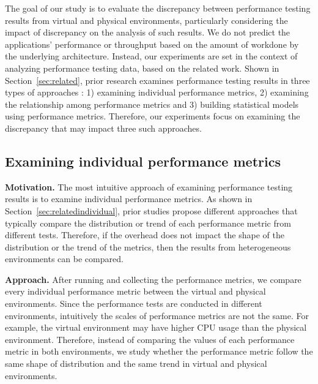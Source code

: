 
The goal of our study is to evaluate the discrepancy between performance testing results from virtual and physical environments, particularly considering the impact of discrepancy on the analysis of such results. We do not predict the applications' performance or throughput based on the amount of workdone by the underlying architecture. Instead, our experiments are set in the context of analyzing performance testing data, based on the related work. Shown in Section~\ref{sec:related}, prior research examines performance testing results in three types of approaches : 1) examining individual performance metrics, 2) examining the relationship among performance metrics and 3) building statistical models using performance metrics. Therefore, our experiments focus on examining the discrepancy that may impact three such approaches.



\subsection{Examining individual performance metrics}
\label{sec:individual}

\noindent \textbf{Motivation.}
The most intuitive approach of examining performance testing results is to examine individual performance metrics. As shown in Section~\ref{sec:relatedindividual}, prior studies propose different approaches that typically compare the distribution or trend of each performance metric from different tests. Therefore, if the overhead does not impact the shape of the distribution or the trend of the metrics, then the results from heterogeneous environments can be compared.

\noindent \textbf{Approach.} 
After running and collecting the performance metrics, we compare every individual performance metric between the virtual and physical environments. Since the performance tests are conducted in different environments, intuitively the scales of performance metrics are not the same. For example, the virtual environment may have higher CPU usage than the physical environment. Therefore, instead of comparing the values of each performance metric in both environments, we study whether the performance metric follow the same shape of distribution and the same trend in virtual and physical environments. 

